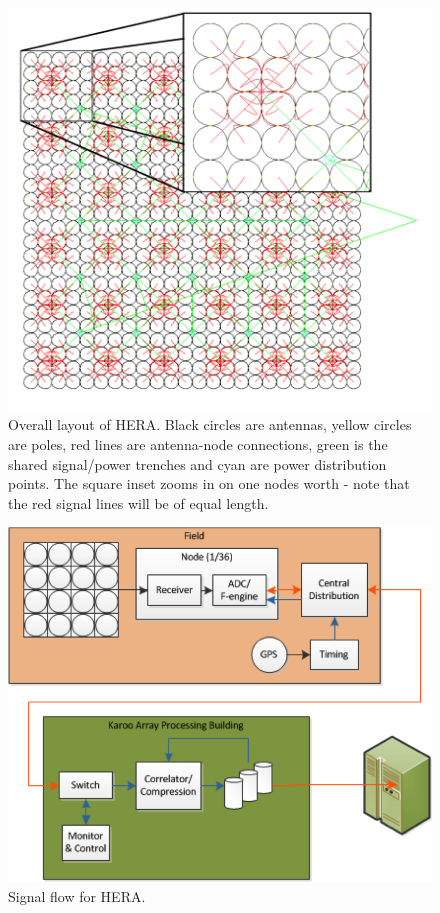 \documentclass[11pt]{article}
\begin{document}
\begin{figure}[H]
\centering
\includegraphics[width=12cm]{plots/heraconfig576.png}
\caption{Overall layout of HERA.  Black circles are antennas, yellow circles are poles, red lines are antenna-node connections,  green is the shared signal/power trenches and cyan are power distribution points.  The square inset zooms in on one nodes worth - note that the red signal lines will be of equal length. }
\label{fig:heraconfig576}
\end{figure}

\begin{figure}[H]
\centering
\includegraphics[width=12cm]{plots/signal_flow.png}
\caption{Signal flow for HERA.}
\label{fig:signal_flow}
\end{figure}
\end{document}
